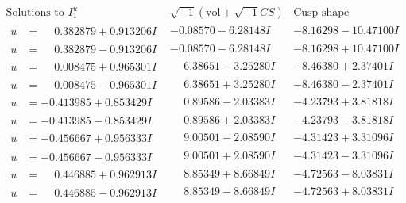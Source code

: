 \documentclass[1p]{elsarticle_modified}
\theoremstyle{definition}
\newcommand{\I}{\sqrt{-1}}
\begin{document}
$$\begin{array}{c|c|c}  
\text{Solutions to }I^u_{1}& \I (\text{vol} + \sqrt{-1}CS) & \text{Cusp shape}\\
 \hline 
\begin{aligned}
u &= \phantom{-}0.382879 + 0.913206 I\end{aligned}
 & -0.08570 + 6.28148 I & -8.16298 - 10.47100 I \\ \hline\begin{aligned}
u &= \phantom{-}0.382879 - 0.913206 I\end{aligned}
 & -0.08570 - 6.28148 I & -8.16298 + 10.47100 I \\ \hline\begin{aligned}
u &= \phantom{-}0.008475 + 0.965301 I\end{aligned}
 & \phantom{-}6.38651 - 3.25280 I & -8.46380 + 2.37401 I \\ \hline\begin{aligned}
u &= \phantom{-}0.008475 - 0.965301 I\end{aligned}
 & \phantom{-}6.38651 + 3.25280 I & -8.46380 - 2.37401 I \\ \hline\begin{aligned}
u &= -0.413985 + 0.853429 I\end{aligned}
 & \phantom{-}0.89586 - 2.03383 I & -4.23793 + 3.81818 I \\ \hline\begin{aligned}
u &= -0.413985 - 0.853429 I\end{aligned}
 & \phantom{-}0.89586 + 2.03383 I & -4.23793 - 3.81818 I \\ \hline\begin{aligned}
u &= -0.456667 + 0.956333 I\end{aligned}
 & \phantom{-}9.00501 - 2.08590 I & -4.31423 + 3.31096 I \\ \hline\begin{aligned}
u &= -0.456667 - 0.956333 I\end{aligned}
 & \phantom{-}9.00501 + 2.08590 I & -4.31423 - 3.31096 I \\ \hline\begin{aligned}
u &= \phantom{-}0.446885 + 0.962913 I\end{aligned}
 & \phantom{-}8.85349 + 8.66849 I & -4.72563 - 8.03831 I \\ \hline\begin{aligned}
u &= \phantom{-}0.446885 - 0.962913 I\end{aligned}
 & \phantom{-}8.85349 - 8.66849 I & -4.72563 + 8.03831 I \\ \hline\begin{aligned}

\end{aligned}
\end{array}$$
\end{document}
